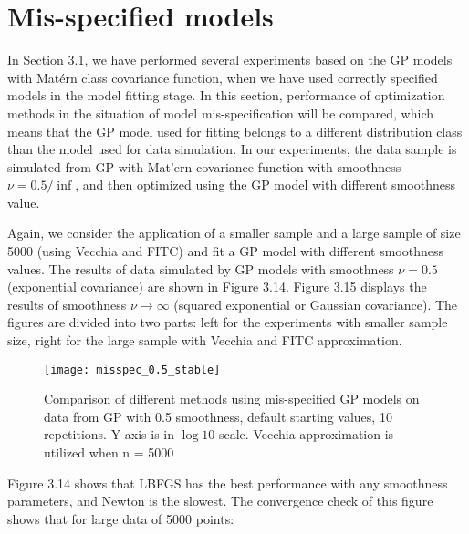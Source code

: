 \section{Mis-specified models}

In Section 3.1, we have performed several experiments based on the GP models with Mat\'ern class covariance function, when we have used correctly specified models in the model fitting stage. In this section, performance of optimization methods in the situation of model mis-specification will be compared, which means that the GP model used for fitting belongs to a different distribution class than the model used for data simulation. In our experiments, the data sample is simulated from GP with Mat'ern covariance function with smoothness $\nu = 0.5/ \inf$, and then optimized using the GP model with different smoothness value.

Again, we consider the application of a smaller sample and a large sample of size 5000 (using Vecchia and FITC) and fit a GP model with different smoothness values. The results of data simulated by GP models with smoothness $\nu=0.5$ (exponential covariance) are shown in Figure 3.14. Figure 3.15 displays the results of smoothness $\nu \xrightarrow{} \infty$ (squared exponential or Gaussian covariance). The figures are divided into two parts: left for the experiments with smaller sample size, right for the large sample with Vecchia and FITC approximation.

\begin{figure}[hbt!]%
  \centering
  \texttt{[image: misspec\_0.5\_stable]} %
  \caption[Times of mis-specified GP with 0.5 smoothness: graphs of different line types with range bars]%
  {Comparison of different methods using mis-specified GP models on data from GP with 0.5 smoothness, default starting values, 10 repetitions. Y-axis is in $\log 10$ scale. Vecchia approximation is utilized when n = 5000}%
  \label{fig:matern_mis_0.5}
\end{figure}

Figure 3.14 shows that LBFGS has the best performance with any smoothness parameters, and Newton is the slowest. The convergence check of this figure shows that for large data of 5000 points:


